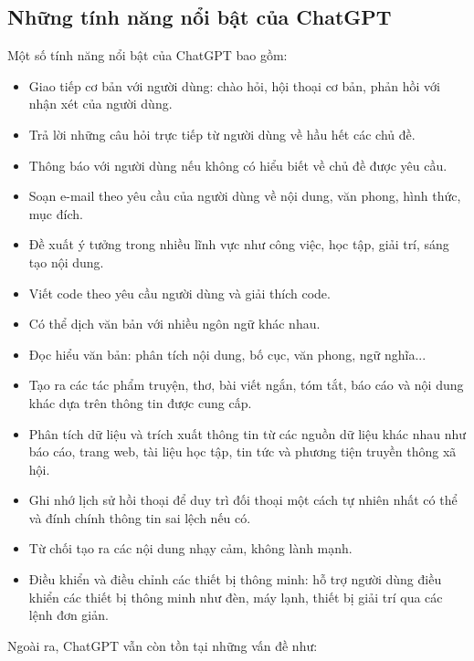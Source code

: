 \documentclass[a4paper, 12pt]{article}
\begin{document}
		
		\subsection{Những tính năng nổi bật của ChatGPT}
		Một số tính năng nổi bật của ChatGPT bao gồm:
		\begin{itemize}
			\item Giao tiếp cơ bản với người dùng: chào hỏi, hội thoại cơ bản, phản hồi với nhận xét của người dùng.
			\item Trả lời những câu hỏi trực tiếp từ người dùng về hầu hết các chủ đề.
			\item Thông báo với người dùng nếu không có hiểu biết về chủ đề được yêu cầu.
			\item Soạn e-mail theo yêu cầu của người dùng về nội dung, văn phong, hình thức, mục đích.
			\item Đề xuất ý tưởng trong nhiều lĩnh vực như công việc, học tập, giải trí, sáng tạo nội dung.
			\item Viết code theo yêu cầu người dùng và giải thích code.
			\item Có thể dịch văn bản với nhiều ngôn ngữ khác nhau.
			\item Đọc hiểu văn bản: phân tích nội dung, bố cục, văn phong, ngữ nghĩa...
			\item Tạo ra các tác phẩm truyện, thơ, bài viết ngắn, tóm tắt, báo cáo và nội dung khác dựa trên thông tin được cung cấp.
			\item Phân tích dữ liệu và trích xuất thông tin từ các nguồn dữ liệu khác nhau như báo cáo, trang web, tài liệu học tập, tin tức và phương tiện truyền thông xã hội.
			\item Ghi nhớ lịch sử hồi thoại để duy trì đối thoại một cách tự nhiên  nhất có thể và đính chính thông tin sai lệch nếu có.
			\item Từ chối tạo ra các nội dung nhạy cảm, không lành mạnh.
			\item Điều khiển và điều chỉnh các thiết bị thông minh: hỗ trợ người dùng điều khiển các thiết bị thông minh như đèn, máy lạnh, thiết bị giải trí qua các lệnh đơn giản.
		\end{itemize}
		Ngoài ra, ChatGPT vẫn còn tồn tại những vấn đề như:
\end{document}
